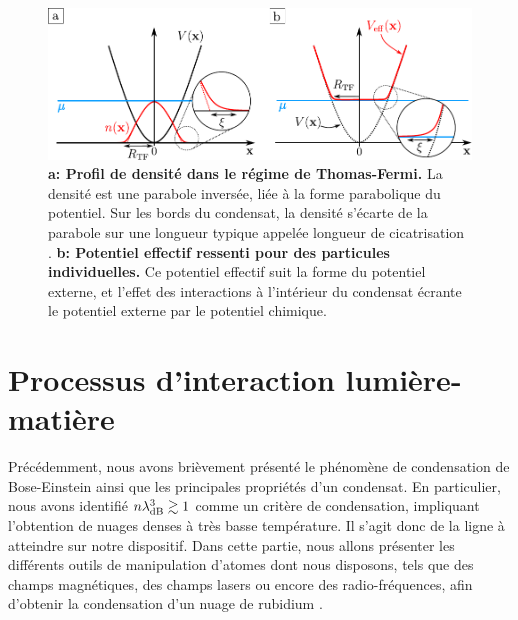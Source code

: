 \begin{figure}
\centering
\includegraphics[width=\textwidth]{Fig/BEC_manip/thomas_fermi.pdf}
\caption{\textbf{a: Profil de densité dans le régime de Thomas-Fermi.} La densité est une parabole inversée, liée à la forme parabolique du potentiel. Sur les bords du condensat, la densité s'écarte de la parabole sur une longueur typique appelée longueur de cicatrisation \protect\footnotemark. \textbf{b: Potentiel effectif ressenti pour des particules individuelles.} Ce potentiel effectif suit la forme du potentiel externe, et l'effet des interactions à l'intérieur du condensat écrante le potentiel externe par le potentiel chimique.}
\label{fig:thomas_fermi}
\end{figure}








\section{Processus d'interaction lumière-matière}
Précédemment, nous avons brièvement présenté le phénomène de condensation de Bose-Einstein ainsi que les principales propriétés d'un condensat. En particulier, nous avons identifié $n \lambda_{\mathrm{dB}}^3 \gtrsim 1$ comme un critère de condensation, impliquant l'obtention de nuages denses à très basse température. Il s'agit donc de la ligne à atteindre sur notre dispositif. Dans cette partie, nous allons présenter les différents outils de manipulation d'atomes dont nous disposons, tels que des champs magnétiques, des champs lasers ou encore des radio-fréquences, afin d'obtenir la condensation d'un nuage de rubidium .


